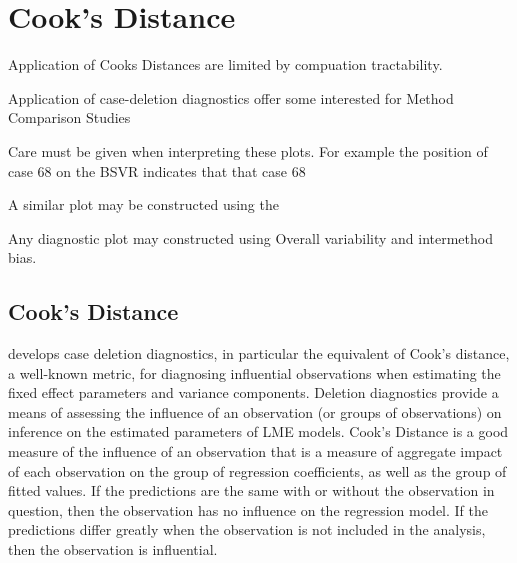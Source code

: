 \documentclass[12pt, a4paper]{report}
\theoremstyle{plain}
\theoremstyle{definition}
\theoremstyle{remark}
\begin{document}
\chapter{Cook's Distance}
Application of Cooks Distances are limited by compuation tractability.


Application of case-deletion diagnostics offer some interested for Method Comparison Studies


Care must be given when interpreting these plots. For example the position of case 68 on the BSVR indicates that that
case 68 

A similar plot may be constructed using the

Any diagnostic plot may constructed using Overall variability and intermethod bias.



\section{Cook's Distance}
\citet{Christensen} develops  case deletion diagnostics, in particular the equivalent of  Cook's distance, a well-known metric, for diagnosing influential observations when estimating the fixed effect parameters and variance components. Deletion diagnostics provide a means of assessing the influence of an observation (or groups of observations) on inference on the estimated parameters of LME models. 
Cook's Distance is a good measure of the influence of an observation that is a measure of aggregate impact of each observation on the group of regression coefficients, as well as the group of fitted values.
If the predictions are the same with or without the observation in question, then the observation has no influence on the regression model. If the predictions differ greatly when the observation is not included in the analysis, then the observation is influential.




\end{document}
